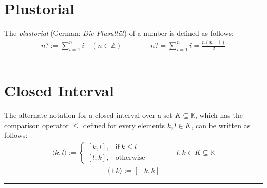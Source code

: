 \documentclass[pdftex,12pt,a4paper]{report}
\begin{document}
    \section{Plustorial}
    The \emph{plustorial} (German: \emph{Die Plusultät}) of a number is defined as follows:
    \begin{equation*}
        \begin{aligned}
            n? := \sum_{i = 1}^n i \quad (n \in \mathbb{Z})
            \qquad\qquad
            n? = \sum_{i = 1}^n i = \frac{n (n - 1)}{2}
        \end{aligned}
    \end{equation*}
    \vspace{5mm} \hrule \vspace{5mm}
    \section{Closed Interval}
    The alternate notation for a closed interval over a set $ K \subseteq \mathbb{K} $, which has the comparison operator $ \leq $ defined for every elements $ k,l \in K $, can be written as follows:
    \begin{equation*}
        \begin{aligned}
            \langle k,l \rangle :=
            \begin{cases}
                \left[ k,l \right], & \text{if}\ k \leq l \\
                \left[ l,k \right], & \text{otherwise}
            \end{cases}
            \qquad\qquad
            l,k \in K \subseteq \mathbb{K}
        \end{aligned}
    \end{equation*}
    \begin{equation*}
        \begin{aligned}
            \langle \pm k \rangle := \left[ -k,k \right]
        \end{aligned}
    \end{equation*}
    \vspace{5mm} \hrule \vspace{5mm}
\end{document}
